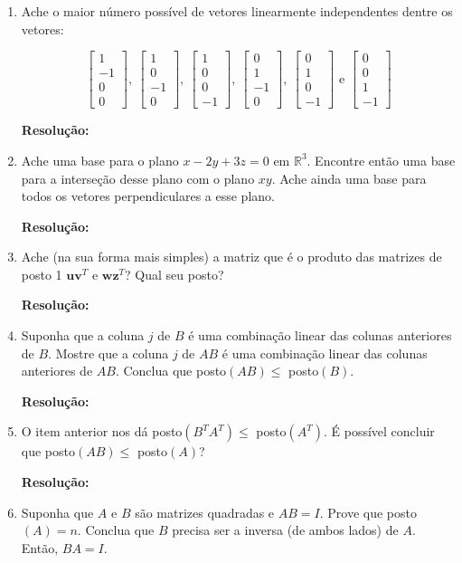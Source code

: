 \documentclass[leqno]{article}
\numberwithin{equation}{section}
\newcommand{\bR}{\mathbb{R}}
\newcommand{\bfw}{\mathbf{w}}
\newcommand{\bfv}{\mathbf{v}}
\newcommand{\bfu}{\mathbf{u}}
\newcommand{\bfz}{\mathbf{z}}
\newcommand{\bvecfour}[4]{%
    \begin{bmatrix} #1 \\ #2 \\ #3 \\ #4 \end{bmatrix}
}
\newenvironment{sol}
{
    \vspace{4mm}
    \noindent\textbf{Resolução:}
    \strut\newline
    \smallskip
    \hspace{-3.5mm}
}
{}
\begin{document}
\begin{enumerate}
	    \begin{sol} 
	    \end{sol} 

    \item Ache o maior número possível de vetores linearmente independentes dentre os vetores:

        $$\bvecfour{1}{-1}{0}{0}, \ \bvecfour{1}{0}{-1}{0}, \ \bvecfour{1}{0}{0}{-1}, \ \bvecfour{0}{1}{-1}{0}, \ \bvecfour{0}{1}{0}{-1} \mbox{ e } \bvecfour{0}{0}{1}{-1}$$

	\begin{sol} 
	\end{sol} 

    \item Ache uma base para o plano $x - 2y + 3z = 0$ em $\bR^3$. Encontre então uma base para a interseção desse plano com o plano $xy$. Ache ainda uma base para todos os vetores perpendiculares a esse plano.

	\begin{sol} 
	\end{sol} 

    \item Ache (na sua forma mais simples) a matriz que é o produto das matrizes de posto 1 $\bfu \bfv^T$ e $\bfw \bfz^T$? Qual seu posto?

	\begin{sol} 
	\end{sol} 

    \item Suponha que a coluna $j$ de $B$ é uma combinação linear das colunas anteriores de $B$. Mostre que a coluna $j$ de $AB$ é uma combinação linear das colunas anteriores de $AB$. Conclua que posto$(AB) \leq $ posto$(B)$.

	\begin{sol} 
	\end{sol} 

    \item O item anterior nos dá posto$(B^T A^T) \leq $ posto$(A^T)$. É possível concluir que posto$(AB) \leq $ posto$(A)$?

	\begin{sol} 
	\end{sol} 

    \item Suponha que $A$ e $B$ são matrizes quadradas e $AB = I$. Prove que posto$(A) = n$. Conclua que $B$ precisa ser a inversa (de ambos lados) de $A$. Então, $BA = I$.


\end{enumerate}
\end{document}
